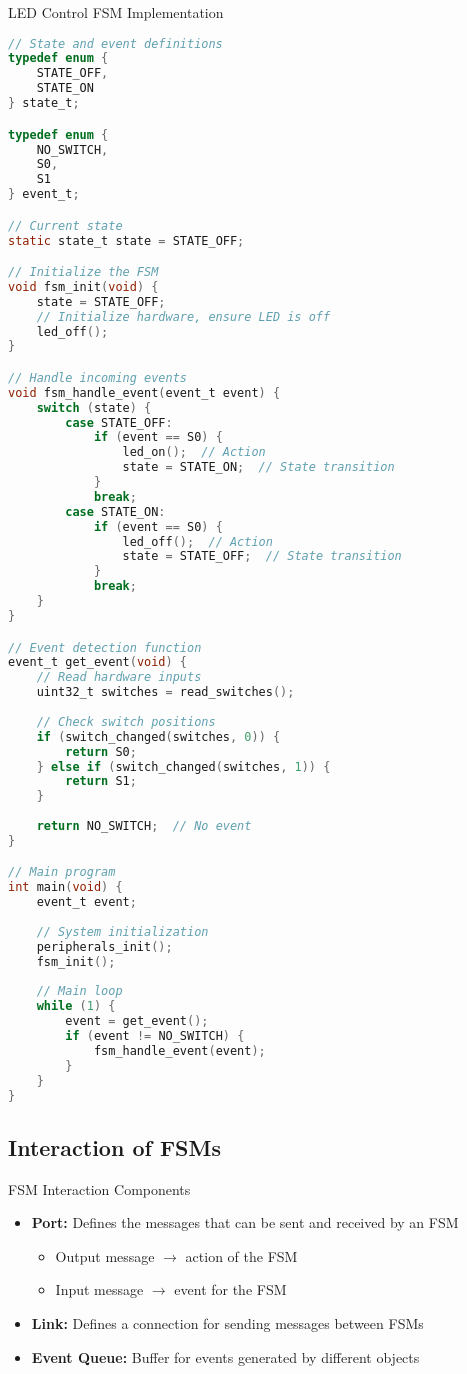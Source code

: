 \begin{examplecode}{LED Control FSM Implementation}
\begin{lstlisting}[language=C, style=basesmol]
// State and event definitions
typedef enum {
    STATE_OFF,
    STATE_ON
} state_t;

typedef enum {
    NO_SWITCH,
    S0,
    S1
} event_t;

// Current state
static state_t state = STATE_OFF;

// Initialize the FSM
void fsm_init(void) {
    state = STATE_OFF;
    // Initialize hardware, ensure LED is off
    led_off();
}

// Handle incoming events
void fsm_handle_event(event_t event) {
    switch (state) {
        case STATE_OFF:
            if (event == S0) {
                led_on();  // Action
                state = STATE_ON;  // State transition
            }
            break;
        case STATE_ON:
            if (event == S0) {
                led_off();  // Action
                state = STATE_OFF;  // State transition
            }
            break;
    }
}

// Event detection function
event_t get_event(void) {
    // Read hardware inputs
    uint32_t switches = read_switches();
    
    // Check switch positions
    if (switch_changed(switches, 0)) {
        return S0;
    } else if (switch_changed(switches, 1)) {
        return S1;
    }
    
    return NO_SWITCH;  // No event
}

// Main program
int main(void) {
    event_t event;
    
    // System initialization
    peripherals_init();
    fsm_init();
    
    // Main loop
    while (1) {
        event = get_event();
        if (event != NO_SWITCH) {
            fsm_handle_event(event);
        }
    }
}
\end{lstlisting}
\end{examplecode}

\subsection{Interaction of FSMs}

\begin{definition}{FSM Interaction Components}
\begin{itemize}
    \item \textbf{Port:} Defines the messages that can be sent and received by an FSM
        \begin{itemize}
            \item Output message $\rightarrow$ action of the FSM
            \item Input message $\rightarrow$ event for the FSM
        \end{itemize}
    \item \textbf{Link:} Defines a connection for sending messages between FSMs
    \item \textbf{Event Queue:} Buffer for events generated by different objects
\end{itemize}
\end{definition}

